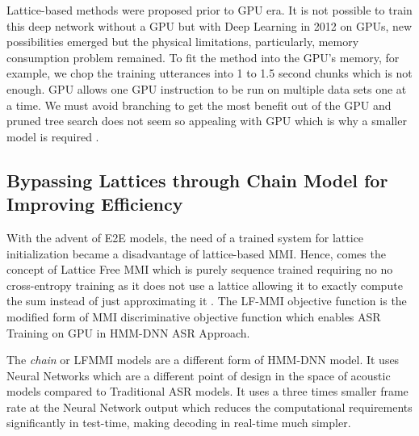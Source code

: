 
Lattice-based methods were proposed prior to GPU era. It is not possible to train this deep network without a GPU but with Deep Learning in 2012 on GPUs, new possibilities emerged but the physical limitations, particularly, memory consumption problem remained. To fit the method into the GPU's memory, for example, we chop the training utterances into 1 to 1.5 second chunks which is not enough. GPU allows one GPU instruction to be run on multiple data sets one at a time. We must avoid branching to get the most benefit out of the GPU and pruned tree search does not seem so appealing with GPU which is why a smaller model is required \cite{povey_purely_2016}.

\subsection{Bypassing Lattices through Chain Model for \\ Improving Efficiency}
With the advent of E2E models, the need of a trained system for lattice initialization became a disadvantage of lattice-based MMI. Hence, comes the concept of Lattice Free MMI \cite{povey_purely_2016, ghahremani_investigation_2017} which is purely sequence trained requiring no no cross-entropy training as it does not use a lattice allowing it to exactly compute the sum instead of just approximating it \cite{noauthor_lattice_nodate}. The LF-MMI objective function is the modified form of MMI discriminative  objective function which enables ASR Training on GPU in HMM-DNN ASR Approach. 

The \textit{chain} or LFMMI models are a different form of HMM-DNN model. It uses Neural Networks \cite{daniel_povey_kaldi_nodate} which are a different point of design in the space of acoustic models compared to Traditional ASR models. It uses a three times smaller frame rate at the Neural Network output which reduces the computational requirements significantly in test-time, making decoding in real-time  much simpler. 

